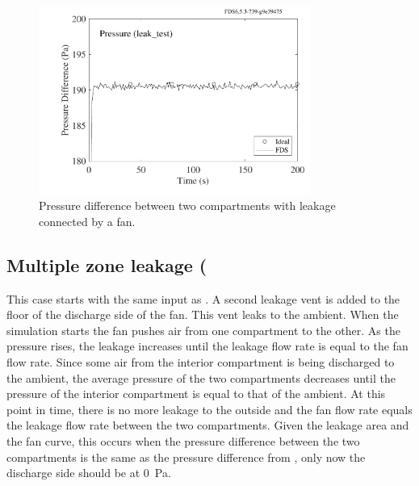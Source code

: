 \documentclass[11pt]{book}
\begin{document}
\begin{figure}[ht]
   \begin{center}
      \includegraphics[width=3.5in]{SCRIPT_FIGURES/leak_test}
     \caption[The  case]{\label{leak_test} Pressure difference between two compartments with leakage connected by a fan.}
   \end{center}
\end{figure}

\subsection{Multiple zone leakage (\texorpdfstring{})}

This case starts with the same input as .  A second leakage vent is added to the floor of the discharge side of the fan.  This vent leaks to the ambient.  When the simulation starts the fan pushes air from one compartment to the other. As the pressure rises, the leakage increases until the leakage flow rate is equal to the fan flow rate. Since some air from the interior compartment is being discharged to the ambient, the average pressure of the two compartments decreases until the pressure of the interior compartment is equal to that of the ambient. At this point in time, there is no more leakage to the outside and the fan flow rate equals the leakage flow rate between the two compartments.  Given the leakage area and the fan curve, this occurs when the pressure difference between the two compartments is the same as the pressure difference from , only now the discharge side should be at 0~Pa.
\end{document}
